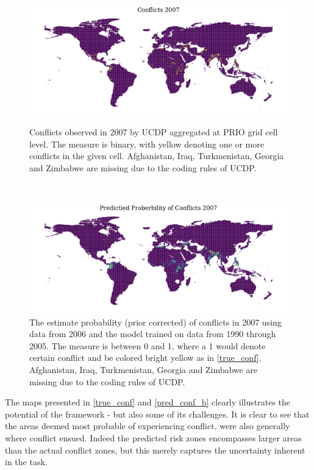 \documentclass[a4paper]{article}
\begin{document}
\begin{figure}[!htb]
  \centering
  \begin{minipage}[b]{1\textwidth}
    \includegraphics[width=\textwidth]{conflicts_2007.pdf}
    \caption{\footnotesize{Conflicts observed in 2007 by UCDP aggregated at PRIO grid cell level. The measure is binary, with yellow denoting one or more conflicts in the given cell. Afghanistan, Iraq, Turkmenistan, Georgia and Zimbabwe are missing due to the coding rules of UCDP.}}\label{true_conf}
  \end{minipage}
  \\	
  \begin{minipage}[b]{1\textwidth}
    \includegraphics[width=\textwidth]{pred_prob_conflicts_2007_bayes.pdf}
    \caption{\footnotesize{The estimate probability (prior corrected) of conflicts in 2007 using data from 2006 and the model trained on data from 1990 through 2005. The measure is between 0 and 1, where a 1 would denote certain conflict and be colored bright yellow as in \autoref{true_conf}. Afghanistan, Iraq, Turkmenistan, Georgia and Zimbabwe are missing due to the coding rules of UCDP.}}\label{pred_conf_b}
  \end{minipage}
\end{figure}

The maps presented in \autoref{true_conf} and \autoref{pred_conf_b} clearly illustrates the potential of the framework - but also some of its challenges. It is clear to see that the areas deemed most probable of experiencing conflict, were also generally where conflict ensued. Indeed the predicted risk zones encompasses larger areas than the actual conflict zones, but this merely captures the uncertainty inherent in the task.\par
\end{document}

